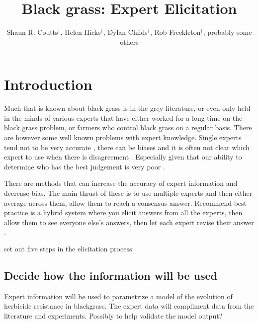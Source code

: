 \documentclass[12pt, a4paper]{article}
\begin{document}
\title{Black grass: Expert Elicitation}
\author{Shaun R. Coutts$^\dag$, Helen Hicks$^\dag$, Dylan Childs$^\dag$, Rob Freckleton$^\ddag$, probably some others}
\maketitle

\section*{Introduction}
Much that is known about black grass is in the grey literature, or even only held in the minds of various experts that have either worked for a long time on the black grass problem, or farmers who control black grass on a regular basis. There are however some well known problems with expert knowledge. Single experts tend not to be very accurate \citep{Burg2014}, there can be biases and it is often not clear which expert to use when there is disagreement \citep{Burg2011, Mart2012}. Especially given that our ability to determine who has the best judgement is very poor \citep{Burg2011}.

There are methods that can increase the accuracy of expert information and decrease bias. The main thrust of these is to use multiple experts and then either average across them, allow them to reach a consensus answer. Recommend best practice is a hybrid system where you elicit answers from all the experts, then allow them to see everyone else's answers, then let each expert revise their answer \citep{Mart2012}.          

\cite{Mart2012} set out five steps in the elicitation process:
\subsection{Decide how the information will be used}
Expert information will be used to parametrize a model of the evolution of herbicide resistance in blackgrass. The expert data will compliment data from the literature and experiments. Possibly to help validate the model output? 
\end{document}
